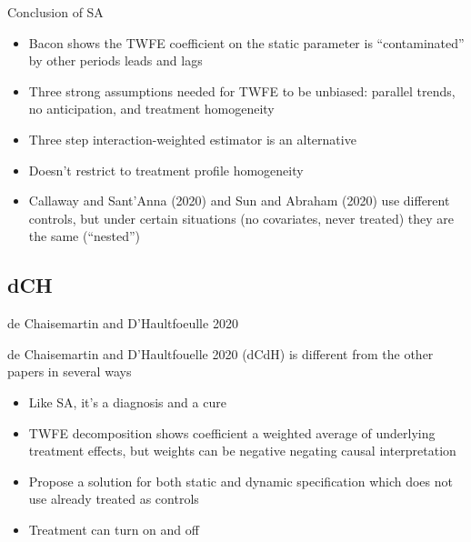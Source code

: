 \documentclass{beamer}
\begin{document}
\begin{frame}{Conclusion of SA}

\begin{itemize}
\item Bacon shows the TWFE coefficient on the static parameter is ``contaminated'' by other periods leads and lags
\item Three strong assumptions needed for TWFE to be unbiased: parallel trends, no anticipation, and treatment homogeneity
\item Three step interaction-weighted estimator is an alternative
\item Doesn't restrict to treatment profile homogeneity 
\item Callaway and Sant'Anna (2020) and Sun and Abraham (2020) use different controls, but under certain situations (no covariates, never treated) they are the same (``nested'')
\end{itemize}

\end{frame}



\subsection{dCH}

\begin{frame}{de Chaisemartin and D'Haultfoeulle 2020}

de Chaisemartin and D'Haultfouelle 2020 (dCdH) is different from the other papers in several ways
	\begin{itemize}
	\item Like SA, it's a diagnosis and a cure
	\item TWFE decomposition shows coefficient a weighted average of underlying treatment effects, but weights can be negative negating causal interpretation
	\item Propose a solution for both static and dynamic specification which does not use already treated as controls
	\item Treatment can turn on and off
	\end{itemize}

\end{frame}
\end{document}
